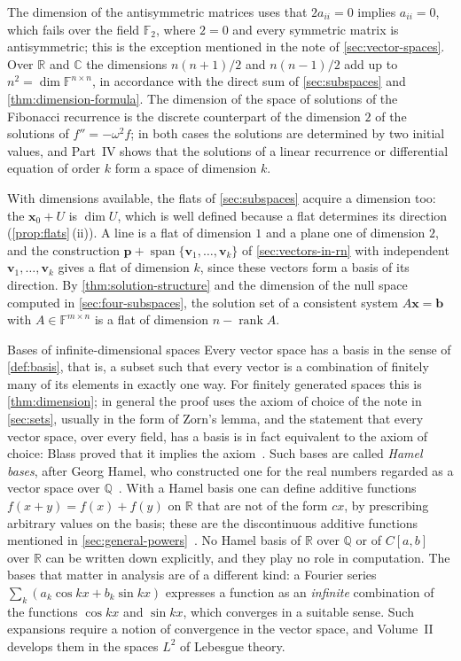 The dimension of the antisymmetric matrices uses that $2a_{ii}=0$ implies $a_{ii}=0$, which fails over the field $\mathbb F_2$, where $2=0$ and every symmetric matrix is antisymmetric; this is the exception mentioned in the note of \cref{sec:vector-spaces}. Over $\mathbb R$ and $\mathbb C$ the dimensions $n(n+1)/2$ and $n(n-1)/2$ add up to $n^2=\dim\mathbb F^{n\times n}$, in accordance with the direct sum of \cref{sec:subspaces} and \cref{thm:dimension-formula}. The dimension of the space of solutions of the Fibonacci recurrence is the discrete counterpart of the dimension $2$ of the solutions of $f''=-\omega^2f$; in both cases the solutions are determined by two initial values, and Part~IV shows that the solutions of a linear recurrence or differential equation of order $k$ form a space of dimension $k$.

With dimensions available, the flats of \cref{sec:subspaces} acquire a dimension too: the  $\mathbf x_0+U$ is $\dim U$, which is well defined because a flat determines its direction (\cref{prop:flats}\,(ii)). A line is a flat of dimension $1$ and a plane one of dimension $2$, and the construction $\mathbf p+\operatorname{span}\{\mathbf v_1,\ldots,\mathbf v_k\}$ of \cref{sec:vectors-in-rn} with independent $\mathbf v_1,\ldots,\mathbf v_k$ gives a flat of dimension $k$, since these vectors form a basis of its direction. By \cref{thm:solution-structure} and the dimension of the null space computed in \cref{sec:four-subspaces}, the solution set of a consistent system $A\mathbf x=\mathbf b$ with $A\in\mathbb F^{m\times n}$ is a flat of dimension $n-\operatorname{rank}A$.

\begin{note}{Bases of infinite-dimensional spaces}
Every vector space has a basis in the sense of \cref{def:basis}, that is, a subset such that every vector is a combination of finitely many of its elements in exactly one way. For finitely generated spaces this is \cref{thm:dimension}; in general the proof uses the axiom of choice of the note in \cref{sec:sets}, usually in the form of Zorn's lemma, and the statement that every vector space, over every field, has a basis is in fact equivalent to the axiom of choice: Blass proved that it implies the axiom~\cite{blass1984}. Such bases are called \emph{Hamel bases}, after Georg Hamel, who constructed one for the real numbers regarded as a vector space over $\mathbb Q$~\cite{hamel1905}. With a Hamel basis one can define additive functions $f(x+y)=f(x)+f(y)$ on $\mathbb R$ that are not of the form $cx$, by prescribing arbitrary values on the basis; these are the discontinuous additive functions mentioned in \cref{sec:general-powers}~\cite{aczel1966}. No Hamel basis of $\mathbb R$ over $\mathbb Q$ or of $C[a,b]$ over $\mathbb R$ can be written down explicitly, and they play no role in computation. The bases that matter in analysis are of a different kind: a Fourier series $\sum_k(a_k\cos kx+b_k\sin kx)$ expresses a function as an \emph{infinite} combination of the functions $\cos kx$ and $\sin kx$, which converges in a suitable sense. Such expansions require a notion of convergence in the vector space, and Volume~II develops them in the spaces $L^2$ of Lebesgue theory.
\end{note}

